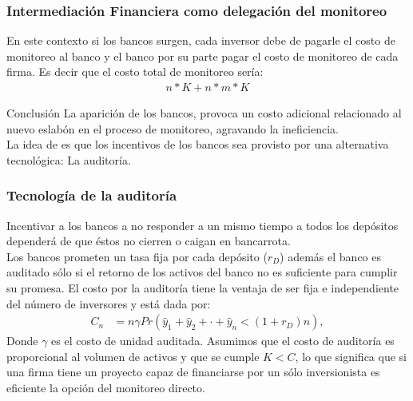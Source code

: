 \documentclass[10pt, xcolor=table, x11names]{beamer}
\begin{document}
\begin{frame}
    \frametitle{{\normalsize Intermediación Financiera como delegación del monitoreo} {}}
   
    En este contexto si los bancos surgen, cada inversor debe de pagarle el costo de monitoreo al banco y el banco por su parte pagar el costo de monitoreo de cada firma. Es decir que el costo total de monitoreo sería:
    \begin{align}
    n*K+n*m*K
    \end{align}
     \begin{block} {Conclusión}
     La aparición de los bancos, provoca un costo adicional relacionado al nuevo eslabón en el proceso de monitoreo, agravando la ineficiencia. \\
     La idea de \cite{Diamond1984} es que los incentivos de los bancos sea provisto por una alternativa tecnológica: La auditoría.   
    \end{block}
    
    
   
\end{frame}

\begin{frame}
    \frametitle{{\normalsize Tecnología de la auditoría} {}}
    
    Incentivar a los bancos a no responder a un mismo tiempo a todos los depósitos dependerá de que éstos no cierren o caigan en bancarrota. \\
    Los bancos prometen un tasa fija por cada depósito ($r_{D}$)  además el banco es auditado sólo si el retorno de los activos del banco no es suficiente para cumplir su promesa.
    El costo por la auditoría tiene la ventaja de ser fija e independiente del número de inversores y está dada por:
    \begin{align}
    C_{n}&=n\gamma Pr(\hat{y}_{1}+\hat{y}_{2}+\cdot+\hat{y}_{n}<(1+r_{D})n),
    \end{align}
    Donde $\gamma$ es el costo de unidad auditada. Asumimos que el costo de auditoría es proporcional al volumen de activos y que se cumple $K<C$, lo que significa que si una firma tiene un proyecto capaz de financiarse por un sólo inversionista  es eficiente la opción del monitoreo directo. 
    
\end{frame}
\end{document}
